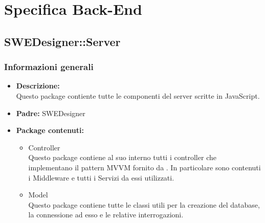 \section{Specifica Back-End}
  \subsection{SWEDesigner::Server}
    \subsubsection{Informazioni generali}
      \begin{itemize}
        \item \textbf{Descrizione:}\\
        Questo package contiente tutte le componenti del server scritte in JavaScript.
        \item \textbf{Padre: } SWEDesigner
        \item \textbf{Package contenuti:}\\
        \begin{itemize}
          \item Controller \\
          Questo package contiene al suo interno tutti i controller che implementano il pattern MVVM fornito da .
          In particolare sono contenuti i Middleware e tutti i Servizi da essi utilizzati.
          \item Model \\
          Questo package contiene tutte le classi utili per la creazione del database, la connessione ad esso e le relative interrogazioni.
        \end{itemize}
      \end{itemize}
